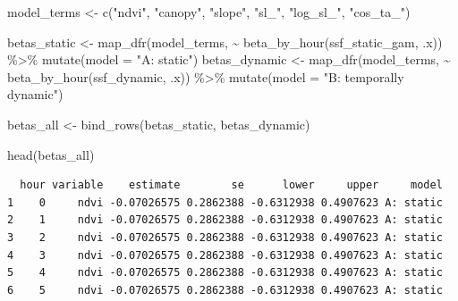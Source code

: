 \documentclass[
  letterpaper,
  DIV=11,
  numbers=noendperiod]{scrartcl}
\newenvironment{Shaded}{\begin{snugshade}}{\end{snugshade}}
\newcommand{\AttributeTok}[1]{\textcolor[rgb]{0.40,0.45,0.13}{#1}}
\newcommand{\FunctionTok}[1]{\textcolor[rgb]{0.28,0.35,0.67}{#1}}
\newcommand{\NormalTok}[1]{\textcolor[rgb]{0.00,0.23,0.31}{#1}}
\newcommand{\OtherTok}[1]{\textcolor[rgb]{0.00,0.23,0.31}{#1}}
\newcommand{\SpecialCharTok}[1]{\textcolor[rgb]{0.37,0.37,0.37}{#1}}
\newcommand{\StringTok}[1]{\textcolor[rgb]{0.13,0.47,0.30}{#1}}
\begin{document}
\begin{Shaded}
\begin{Highlighting}[]
\NormalTok{model\_terms }\OtherTok{\textless{}{-}} \FunctionTok{c}\NormalTok{(}\StringTok{"ndvi"}\NormalTok{, }\StringTok{"canopy"}\NormalTok{, }\StringTok{"slope"}\NormalTok{, }\StringTok{"sl\_"}\NormalTok{, }\StringTok{"log\_sl\_"}\NormalTok{, }\StringTok{"cos\_ta\_"}\NormalTok{)}

\NormalTok{betas\_static  }\OtherTok{\textless{}{-}} \FunctionTok{map\_dfr}\NormalTok{(model\_terms, }\SpecialCharTok{\textasciitilde{}} \FunctionTok{beta\_by\_hour}\NormalTok{(ssf\_static\_gam, .x)) }\SpecialCharTok{\%\textgreater{}\%}
  \FunctionTok{mutate}\NormalTok{(}\AttributeTok{model =} \StringTok{"A: static"}\NormalTok{)}
\NormalTok{betas\_dynamic }\OtherTok{\textless{}{-}} \FunctionTok{map\_dfr}\NormalTok{(model\_terms, }\SpecialCharTok{\textasciitilde{}} \FunctionTok{beta\_by\_hour}\NormalTok{(ssf\_dynamic, .x)) }\SpecialCharTok{\%\textgreater{}\%}
  \FunctionTok{mutate}\NormalTok{(}\AttributeTok{model =} \StringTok{"B: temporally dynamic"}\NormalTok{)}

\NormalTok{betas\_all }\OtherTok{\textless{}{-}} \FunctionTok{bind\_rows}\NormalTok{(betas\_static, betas\_dynamic)}

\FunctionTok{head}\NormalTok{(betas\_all)}
\end{Highlighting}
\end{Shaded}

\begin{verbatim}
  hour variable    estimate        se      lower     upper     model
1    0     ndvi -0.07026575 0.2862388 -0.6312938 0.4907623 A: static
2    1     ndvi -0.07026575 0.2862388 -0.6312938 0.4907623 A: static
3    2     ndvi -0.07026575 0.2862388 -0.6312938 0.4907623 A: static
4    3     ndvi -0.07026575 0.2862388 -0.6312938 0.4907623 A: static
5    4     ndvi -0.07026575 0.2862388 -0.6312938 0.4907623 A: static
6    5     ndvi -0.07026575 0.2862388 -0.6312938 0.4907623 A: static
\end{verbatim}
\end{document}
